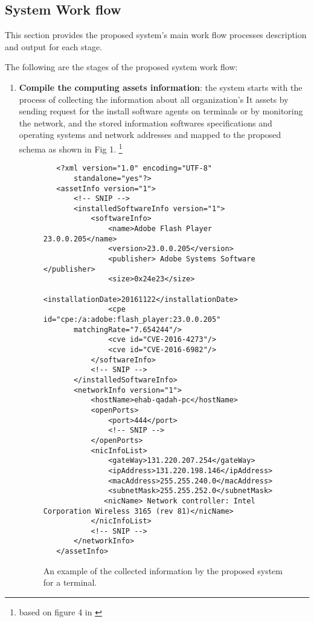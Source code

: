 \documentclass{llncs}
\begin{document}
\subsection{System Work flow}

This section provides the proposed system's main work flow processes description and output for each stage. 

The following are the stages of the proposed system work flow:
 
\begin{enumerate}
 \item \textbf{Compile the computing assets information}: the system starts with the process of collecting the information about all organization's It assets by sending request for the install software agents on terminals or by monitoring the network, and the stored information softwares specifications and operating systems and network addresses and mapped to the proposed schema as shown in Fig 1.  \footnote{based on figure 4 in \cite{paper1}} 
 
 \begin{figure}
 \centering
   \lstset{language=XML}
    \begin{lstlisting}
   <?xml version="1.0" encoding="UTF-8"
       standalone="yes"?>
   <assetInfo version="1">
       <!-- SNIP -->
       <installedSoftwareInfo version="1">
           <softwareInfo>
               <name>Adobe Flash Player 23.0.0.205</name>
               <version>23.0.0.205</version>
               <publisher> Adobe Systems Software </publisher>
               <size>0x24e23</size>
               <installationDate>20161122</installationDate>
               <cpe id="cpe:/a:adobe:flash_player:23.0.0.205"
       matchingRate="7.654244"/>
               <cve id="CVE-2016-4273"/>
               <cve id="CVE-2016-6982"/>
           </softwareInfo>
           <!-- SNIP -->
       </installedSoftwareInfo>
       <networkInfo version="1">
           <hostName>ehab-qadah-pc</hostName>
           <openPorts>
               <port>444</port>
               <!-- SNIP -->
           </openPorts>
           <nicInfoList>
               <gateWay>131.220.207.254</gateWay>
               <ipAddress>131.220.198.146</ipAddress>
               <macAddress>255.255.240.0</macAddress>
               <subnetMask>255.255.252.0</subnetMask>
              <nicName> Network controller: Intel Corporation Wireless 3165 (rev 81)</nicName>
           </nicInfoList>
           <!-- SNIP -->
       </networkInfo>
   </assetInfo>
    \end{lstlisting}
   \caption{An example of the collected information by the proposed system for  a terminal.}
    \end{figure}
   

\end{enumerate}
\end{document}
